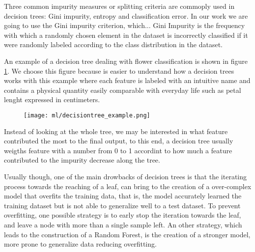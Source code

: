 \documentclass[a4paper,11pt]{article}
\begin{document}
Three common impurity measures or splitting criteria are commoply used in decision trees: Gini impurity, entropy and classification error.
In our work we are going to use the Gini impurity criterion, which...
Gini Impurity is the frequency with which a randomly chosen element in the dataset is incorrectly classified if it were randomly labeled according to the class distribution in the dataset.

An example of a decision tree dealing with flower classification is shown in figure \ref{fig:decisiontree}.
We choose this figure because is easier to understand how a decision trees works with this example where each feature is labeled with an intuitive name and contains a physical quantity easily comparable with everyday life such as petal lenght expressed in centimeters.

\begin{figure}
\centering
\texttt{[image: ml/decisiontree\_example.png]}
\caption{}
\label{fig:decisiontree}
\end{figure}

Instead of looking at the whole tree, we may be interested in what feature contributed the most to the final output, to this end, a decision tree usually weigths feature with a number from 0 to 1 accordint to how much a feature contributed to the impurity decrease along the tree.
\cite{raschka-2019} \cite{muller-2017}

Usually though, one of the main drowbacks of decision trees is that the iterating process towards the reaching of a leaf, can bring to the creation of a over-complex model that overfits the training data, that is, the model accurately learned the training dataset but is not able to generalize well to a test dataset.
To prevent overfitting, one possible strategy is to early stop the iteration towards the leaf, and leave a node with more than a single sample left.
An other strategy, which leads to the construction of a Random Forest, is the creation of a stronger model, more prone to generalize data reducing overfitting.
\end{document}

